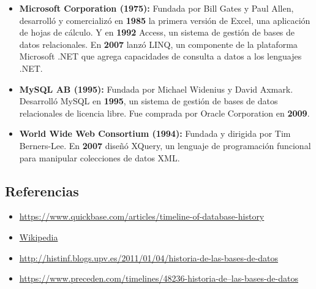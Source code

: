 \documentclass{article}
\begin{document}
\begin{itemize}
\item \textbf{Microsoft Corporation (1975):} Fundada por Bill Gates y
  Paul Allen, desarrolló y comercializó en \textbf{1985} la primera
  versión de Excel, una aplicación de hojas de cálculo. Y en
  \textbf{1992} Access, un sistema de gestión de bases de datos
  relacionales. En \textbf{2007} lanzó LINQ, un componente de la
  plataforma Microsoft .NET que agrega capacidades de consulta a datos
  a los lenguajes .NET.

\item \textbf{MySQL AB (1995):} Fundada por Michael Widenius y David
  Axmark. Desarrolló MySQL en \textbf{1995}, un sistema de gestión de
  bases de datos relacionales de licencia libre. Fue comprada por
  Oracle Corporation en \textbf{2009}.

\item \textbf{World Wide Web Consortium (1994):} Fundada y dirigida
  por Tim Berners-Lee. En \textbf{2007} diseñó XQuery, un lenguaje de programación
  funcional para manipular colecciones de datos XML.

\end{itemize}

\subsection*{Referencias}
\begin{itemize}
\item \href{https://www.quickbase.com/articles/timeline-of-database-history}{https://www.quickbase.com/articles/timeline-of-database-history}
\item \href{https://www.wikipedia.org}{Wikipedia}
\item \href{http://histinf.blogs.upv.es/2011/01/04/historia-de-las-bases-de-datos}{http://histinf.blogs.upv.es/2011/01/04/historia-de-las-bases-de-datos}
\item \href{https://www.preceden.com/timelines/48236-historia-de--las-bases-de-datos}{https://www.preceden.com/timelines/48236-historia-de--las-bases-de-datos}
\end{itemize}
\end{document}

